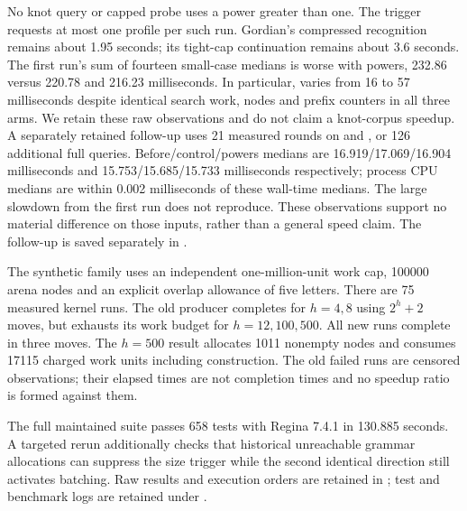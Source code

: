

No knot query or capped probe uses a power greater than one. The trigger
requests at most one profile per such run. Gordian's compressed recognition
remains about 1.95 seconds; its tight-cap continuation remains about
3.6 seconds. The first run's sum of fourteen small-case medians is worse
with powers, 232.86 versus 220.78 and 216.23 milliseconds. In particular,
 varies from 16 to 57 milliseconds despite identical
search work, nodes and prefix counters in all three arms. We retain these
raw observations and do not claim a knot-corpus speedup.
A separately retained follow-up uses 21 measured rounds on
 and , or 126 additional full queries.
Before/control/powers medians are 16.919/17.069/16.904 milliseconds and
15.753/15.685/15.733 milliseconds respectively; process CPU medians are
within 0.002 milliseconds of these wall-time medians. The large slowdown
from the first run does not reproduce. These observations support no
material difference on those inputs, rather than a general speed claim.
The follow-up is saved separately in
.

The synthetic family uses an independent one-million-unit work cap,
100000 arena nodes and an explicit overlap allowance of five letters.
There are 75 measured kernel runs. The old producer completes for $h=4,8$
using $2^h+2$ moves, but exhausts its work budget for $h=12,100,500$.
All new runs complete in three moves. The $h=500$ result allocates 1011
nonempty nodes and consumes 17115 charged work units including construction.
The old failed runs are censored observations; their elapsed times are not
completion times and no speedup ratio is formed against them.



The full maintained suite passes 658 tests with Regina 7.4.1 in
130.885 seconds. A targeted rerun additionally checks that historical
unreachable grammar allocations can suppress the size trigger while the
second identical direction still activates batching. Raw results and
execution orders are retained in
; test and benchmark logs
are retained under .

